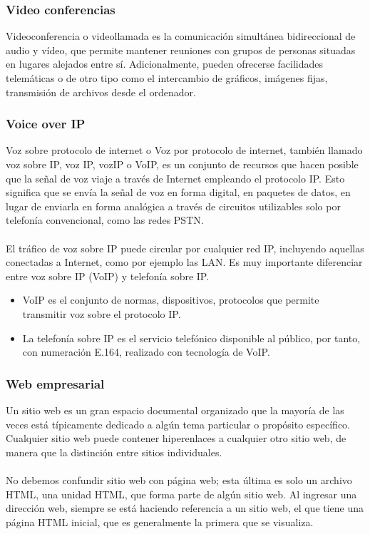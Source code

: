 \documentclass[12pt,letterpaper]{article}
\begin{document}
\subsubsection{Video conferencias}
Videoconferencia o videollamada es la comunicación simultánea bidireccional de audio y vídeo, 
que permite mantener reuniones con grupos de personas situadas en lugares alejados entre sí. 
Adicionalmente, pueden ofrecerse facilidades telemáticas o de otro tipo como el intercambio 
de gráficos, imágenes fijas, transmisión de archivos desde el ordenador. \cite{videoConferencia}

\subsubsection{Voice over IP}
Voz sobre protocolo de internet o Voz por protocolo de internet, también llamado voz sobre IP, 
voz IP, vozIP o VoIP, es un conjunto de recursos que hacen posible que la señal de voz viaje 
a través de Internet empleando el protocolo IP. Esto significa que se envía la señal de voz 
en forma digital, en paquetes de datos, en lugar de enviarla en forma analógica a través de 
circuitos utilizables solo por telefonía convencional, como las redes PSTN. \cite{VoIP}
\\ \\ 
El tráfico de voz sobre IP puede circular por cualquier red IP, incluyendo aquellas conectadas 
a Internet, como por ejemplo las LAN.
Es muy importante diferenciar entre voz sobre IP (VoIP) y telefonía sobre IP.
\begin{itemize}
    \item VoIP es el conjunto de normas, dispositivos, protocolos que permite transmitir voz sobre el protocolo IP.
    \item La telefonía sobre IP es el servicio telefónico disponible al público, por tanto, con numeración E.164, realizado con tecnología de VoIP.
\end{itemize}

\subsubsection{Web empresarial}
Un sitio web es un gran espacio documental organizado que la mayoría de las veces está 
típicamente dedicado a algún tema particular o propósito específico. Cualquier sitio web 
puede contener hiperenlaces a cualquier otro sitio web, de manera que la distinción entre 
sitios individuales.
\\ \\ 
No debemos confundir sitio web con página web; esta última es solo un archivo HTML, una 
unidad HTML, que forma parte de algún sitio web. Al ingresar una dirección web, siempre 
se está haciendo referencia a un sitio web, el que tiene una página HTML inicial, que es 
generalmente la primera que se visualiza. \cite{web}
\end{document}

